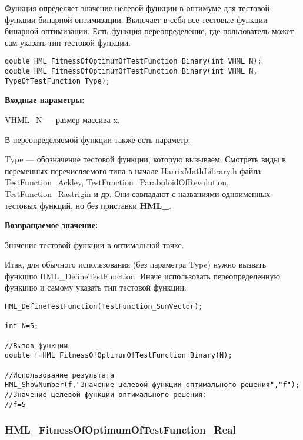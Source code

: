 \documentclass[a4paper,12pt]{article}
\begin{document}
Функция определяет значение целевой функции в оптимуме для тестовой функции бинарной оптимизации. Включает в себя все тестовые функции бинарной оптимизации. Есть функция-переопределение, где пользователь может сам указать тип тестовой функции.


\begin{lstlisting}[label=code_syntax_HML_FitnessOfOptimumOfTestFunction_Binary,caption=Синтаксис]
double HML_FitnessOfOptimumOfTestFunction_Binary(int VHML_N);
double HML_FitnessOfOptimumOfTestFunction_Binary(int VHML_N, TypeOfTestFunction Type);
\end{lstlisting}

\textbf{Входные параметры:}

VHML\_N --- размер массива x.

В переопределяемой функции также есть параметр:
  
Type --- обозначение тестовой функции, которую вызываем.
Смотреть виды в переменных перечисляемого типа в начале HarrixMathLibrary.h файла: TestFunction\_Ackley, TestFunction\_ParaboloidOfRevolution, TestFunction\_Rastrigin и др. Они совпадают с названиями одноименных тестовых функций, но без приставки \textbf{HML\_}.

\textbf{Возвращаемое значение:}
 
Значение тестовой функции в оптимальной точке.

Итак, для обычного использования (без параметра Type) нужно вызвать функцию HML\_DefineTestFunction. Иначе использовать переопределенную функцию и самому указать тип тестовой функции.


\begin{lstlisting}[label=code_use_HML_FitnessOfOptimumOfTestFunction_Binary,caption=Пример использования]
HML_DefineTestFunction(TestFunction_SumVector);

int N=5;

//Вызов функции
double f=HML_FitnessOfOptimumOfTestFunction_Binary(N);

//Использование результата
HML_ShowNumber(f,"Значение целевой функции оптимального решения","f");
//Значение целевой функции оптимального решения:
//f=5
\end{lstlisting}

\subsubsection{HML\_FitnessOfOptimumOfTestFunction\_Real}\label{HML_FitnessOfOptimumOfTestFunction_Real}
\end{document}
